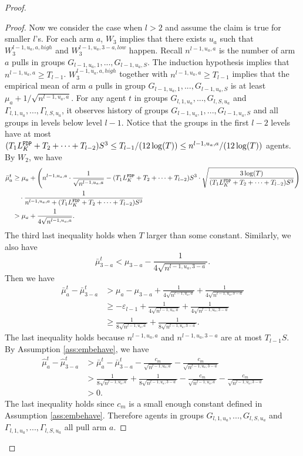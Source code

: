 \begin{proof}
\begin{proof}
Now we consider the case when $l > 2$ and assume the claim is true for smaller $l$'s. For each arm $a$, $W_3$ implies that there exists $u_a$ such that $W^{l-1,u_a,a,high}_3$ and $W^{l-1,u_a,3-a,low}_3$ happen. Recall $n^{l-1,u_a,a}$ is the number of arm $a$ pulls in groups $G_{l-1,u_a,1},...,G_{l-1,u_a,S}$. The induction hypothesis implies that $n^{l-1,u_a,a} \geq T_{l-1}$. $W^{l-1,u_a,a,high}_3$ together with $n^{l-1,u_a,a} \geq T_{l-1}$ implies that the empirical mean of arm $a$ pulls in group $G_{l-1,u_a,1},...,G_{l-1,u_a,S}$ is at least $\mu_a + 1/\sqrt{n^{l-1,u_a,a}}$. For any agent $t$ in groups $G_{l,1,u_a},...,G_{l,S,u_a}$ and $\Gamma_{l,1,u_a},...,\Gamma_{l,S,u_a}$, it observes history of groups $G_{l-1,u_a,1},...,G_{l-1,u_a,S}$ and all groups in levels below level $l-1$. Notice that the groups in the first $l-2$ levels have at most $(T_1 L^\mathtt{FDP}_K + T_2 + \cdots +T_{l-2})S^3 \leq T_{l-1}/(12\log(T)) \leq n^{l-1,u_a,a}/(12\log(T))$ agents. By $W_2$, we have
\begin{align*}
\bar{\mu}_a ^t &\geq \mu_a + \left(n^{l-1,u_a,a}  \cdot \frac{1}{\sqrt{n^{l-1,u_a,a} }}- (T_1 L^\mathtt{FDP}_K + T_2 + \cdots +T_{l-2})S^3\cdot \sqrt{\frac{3\log(T)}{ (T_1 L^\mathtt{FDP}_K + T_2 + \cdots +T_{l-2})S^3}} \right) \\
&~~~\cdot \frac{1}{n^{l-1,u_a,a}+ (T_1 L^\mathtt{FDP}_K + T_2 + \cdots +T_{l-2})S^3} \\
&> \mu_a + \frac{1}{4\sqrt{n^{l-1,u_a,a}  }}.
\end{align*}
The third last inequality holds when $T$ larger than some constant.
Similarly, we also have
\[
\bar{\mu}_{3-a}^t < \mu_{3-a}   -\frac{1}{4\sqrt{n^{l-1,u_a,3-a}  }}.
\]
Then we have
\begin{align*}
\bar{\mu}^t_a - \bar{\mu}^t_{3-a} &> \mu_a - \mu_{3-a}+ \frac{1}{4\sqrt{n^{l-1,u_a,a}  }} +\frac{1}{4\sqrt{n^{l-1,u_a,3-a}  }}\\
&\geq -\varepsilon_{l-1}+ \frac{1}{4\sqrt{n^{l-1,u_a,a}  }} +\frac{1}{4\sqrt{n^{l-1,u_a,3-a}  }}\\
&\geq \frac{1}{8\sqrt{n^{l-1,u_a,a}  }} +\frac{1}{8\sqrt{n^{l-1,u_a,3-a}  }}.
\end{align*}
The last inequality holds because $n^{l-1,u_a,a}$ and $n^{l-1,u_a,3-a}$ are at most $T_{l-1} S$. By Assumption \ref{ass:embehave}, we have
\begin{align*}
\hat{\mu}_a^t - \hat{\mu}_{3-a}^t &> \bar{\mu}^t_a - \bar{\mu}^t_{3-a} -  \frac{c_m}{\sqrt{n^{l-1,u_a,a} }} - \frac{c_m}{\sqrt{n^{l-1,u_a,3-a}}}\\
&> \frac{1}{8\sqrt{n^{l-1,u_a,a}  }} +\frac{1}{8\sqrt{n^{l-1,u_a,3-a}  }} -  \frac{c_m}{\sqrt{n^{l-1,u_a,a} }} - \frac{c_m}{\sqrt{n^{l-1,u_a,3-a}}}\\
&>0.
\end{align*}
The last inequality holds since $c_m$ is a small enough constant defined in Assumption \ref{ass:embehave}.
Therefore agents in groups $G_{l,1,u_a},...,G_{l,S,u_a}$ and $\Gamma_{l,1,u_a},...,\Gamma_{l,S,u_a}$ all pull arm $a$.
\end{proof}


\end{proof}
